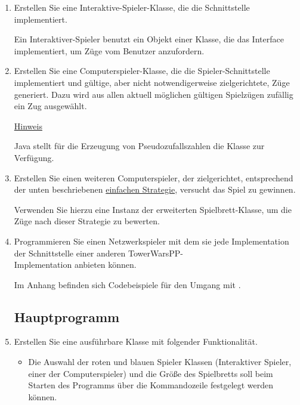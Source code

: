 \begin{enumerate}
\item Erstellen Sie eine Interaktive-Spieler-Klasse, die die Schnittstelle \\  implementiert.

Ein Interaktiver-Spieler benutzt ein Objekt einer Klasse, die das Interface \\  implementiert, um Züge vom Benutzer anzufordern.

\item Erstellen Sie eine Computerspieler-Klasse, die die Spieler-Schnittstelle implementiert und gültige, aber nicht notwendigerweise zielgerichtete, Züge generiert. Dazu wird aus allen aktuell möglichen gültigen Spielzügen zufällig ein Zug ausgewählt.

\underline{Hinweis}

Java stellt für die Erzeugung von Pseudozufallszahlen die Klasse  zur Verfügung.

\item Erstellen Sie einen weiteren Computerspieler, der zielgerichtet, entsprechend der unten beschriebenen \hyperlink{strategy}{einfachen Strategie}, versucht das Spiel zu gewinnen.

Verwenden Sie hierzu eine Instanz der erweiterten Spielbrett-Klasse, um die Züge nach dieser Strategie zu bewerten.

\item Programmieren Sie einen Netzwerkspieler mit dem sie jede Implementation der Schnittstelle  einer anderen TowerWarsPP- \\Implementation anbieten können.

Im Anhang befinden sich Codebeispiele für den Umgang mit .

\newpage
\subsection*{Hauptprogramm}
\item Erstellen Sie eine ausführbare Klasse mit folgender Funktionalität.
\begin{itemize}
\item Die Auswahl der roten und blauen Spieler Klassen (Interaktiver Spieler, einer der Computerspieler) und die Größe des Spielbretts soll beim Starten des Programms über die Kommandozeile festgelegt werden können.


\end{itemize}
\end{enumerate}
